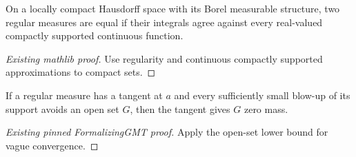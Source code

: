 \begin{lemma}
\label{mathlib:regular-measure-ext}
\leanok
On a locally compact Hausdorff space with its Borel measurable structure,
two regular measures are equal if their integrals agree against every
real-valued compactly supported continuous function.
\end{lemma}
\begin{proof}[Existing mathlib proof]
\leanok
Use regularity and continuous compactly supported approximations to compact sets.
\end{proof}

\begin{lemma}
\label{gmt:tangent-open-null}
\leanok
If a regular measure has a tangent at $a$ and every sufficiently small blow-up
of its support avoids an open set $G$, then the tangent gives $G$ zero mass.
\end{lemma}
\begin{proof}[Existing pinned FormalizingGMT proof]
\leanok
Apply the open-set lower bound for vague convergence.
\end{proof}
